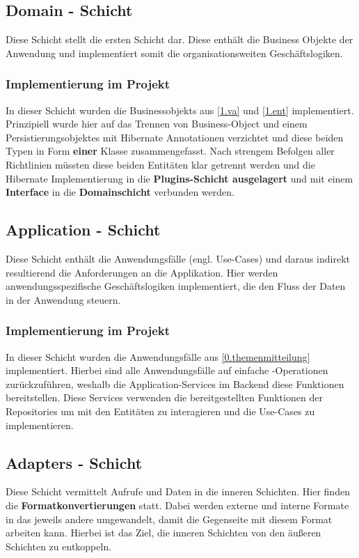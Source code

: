 		\subsection{Domain - Schicht} \label{2.domain}
		Diese Schicht stellt die ersten  Schicht dar. Diese enthält die Business Objekte der Anwendung und implementiert somit die organisationsweiten Geschäftslogiken. 
			\subsubsection{Implementierung im Projekt}
			In dieser Schicht wurden die Businessobjekts aus \cref{1.va} und \cref{1.ent} implementiert. Prinzipiell wurde hier auf das Trennen von Business-Object und einem Persistierungsobjektes mit Hibernate Annotationen verzichtet und diese beiden Typen in Form \textbf{einer} Klasse zusammengefasst. Nach strengem Befolgen aller Richtlinien müssten diese beiden Entitäten klar getrennt werden und die Hibernate Implementierung in die \textbf{Plugins-Schicht ausgelagert} und mit einem \textbf{Interface} in die\textbf{ Domainschicht} verbunden werden.
		
		\subsection{Application - Schicht}
		Diese Schicht enthält die Anwendungsfälle (engl. Use-Cases) und daraus indirekt resultierend die Anforderungen an die Applikation. Hier werden anwendungsspezifische Geschäftslogiken implementiert, die den Fluss der Daten in der Anwendung steuern. 
			\subsubsection{Implementierung im Projekt}
			In dieser Schicht wurden die Anwendungsfälle aus \cref{0.themenmitteilung} implementiert. Hierbei sind alle Anwendungsfälle auf einfache -Operationen zurückzuführen, weshalb die Application-Services im Backend diese Funktionen bereitstellen. Diese Services verwenden die bereitgestellten Funktionen der Repositories um mit den Entitäten zu interagieren und die Use-Cases zu implementieren.
			
		\subsection{Adapters - Schicht}
		Diese Schicht vermittelt Aufrufe und Daten in die inneren Schichten. Hier finden die \textbf{Formatkonvertierungen} statt. Dabei werden externe und interne Formate in das jeweils andere umgewandelt, damit die Gegenseite mit diesem Format arbeiten kann. Hierbei ist das Ziel, die inneren Schichten von den äußeren Schichten zu entkoppeln.
